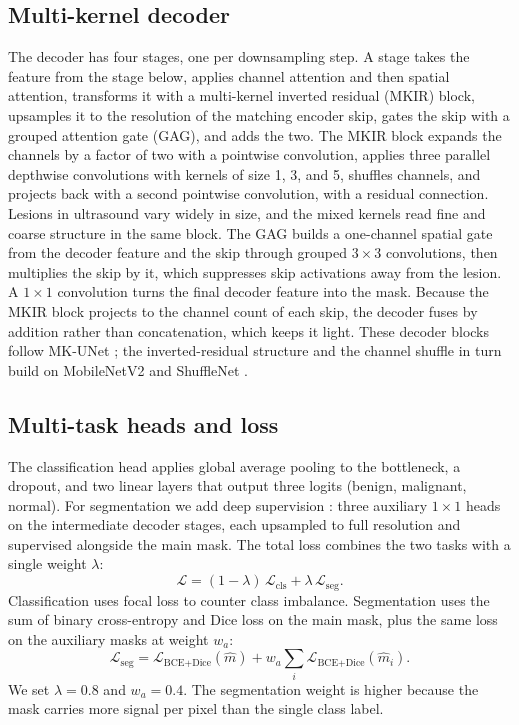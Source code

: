 \documentclass[runningheads]{llncs}
\begin{document}
\subsection{Multi-kernel decoder}
The decoder has four stages, one per downsampling step. A stage takes the feature
from the stage below, applies channel attention \cite{SENet} and then spatial
attention, transforms it with a multi-kernel inverted residual (MKIR) block,
upsamples it to the resolution of the matching encoder skip, gates the skip with
a grouped attention gate (GAG), and adds the two. The MKIR block expands the
channels by a factor of two with a pointwise convolution, applies three parallel
depthwise convolutions with kernels of size 1, 3, and 5, shuffles channels, and
projects back with a second pointwise convolution, with a residual connection.
Lesions in ultrasound vary widely in size, and the mixed kernels read fine and
coarse structure in the same block. The GAG builds a one-channel spatial gate
from the decoder feature and the skip through grouped $3\times3$ convolutions,
then multiplies the skip by it, which suppresses skip activations away from the
lesion. A $1\times1$ convolution turns the final decoder feature into the mask.
Because the MKIR block projects to the channel count of each skip, the decoder
fuses by addition rather than concatenation, which keeps it light. These decoder
blocks follow MK-UNet \cite{MKUNet}; the inverted-residual structure and the
channel shuffle in turn build on MobileNetV2 \cite{MobileNetV2} and ShuffleNet
\cite{ShuffleNet}.

\subsection{Multi-task heads and loss}
The classification head applies global average pooling to the bottleneck, a
dropout, and two linear layers that output three logits (benign, malignant,
normal). For segmentation we add deep supervision \cite{DSN}: three auxiliary
$1\times1$ heads on the intermediate decoder stages, each upsampled to full
resolution and supervised alongside the main mask. The total loss combines the
two tasks with a single weight $\lambda$:
\begin{equation}
\mathcal{L} = (1-\lambda)\,\mathcal{L}_{\text{cls}} + \lambda\,\mathcal{L}_{\text{seg}}.
\end{equation}
Classification uses focal loss \cite{Focal} to counter class imbalance.
Segmentation uses the sum of binary cross-entropy and Dice loss \cite{VNet} on
the main mask, plus the same loss on the auxiliary masks at weight $w_a$:
\begin{equation}
\mathcal{L}_{\text{seg}} = \mathcal{L}_{\text{BCE+Dice}}(\hat{m})
+ w_a \sum_{i} \mathcal{L}_{\text{BCE+Dice}}(\hat{m}_i).
\end{equation}
We set $\lambda=0.8$ and $w_a=0.4$. The segmentation weight is higher because the
mask carries more signal per pixel than the single class label.
\end{document}

